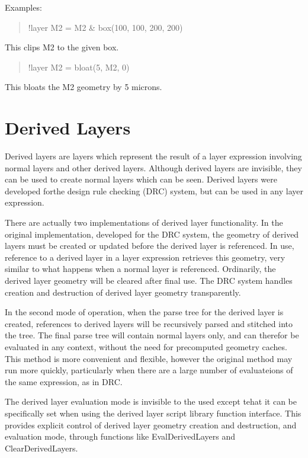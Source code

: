     Examples:

\begin{quote}
    {\vt !layer M2 = M2 \& box(100, 100, 200, 200)}
\end{quote}
      This clips M2 to the given box.

\begin{quote}
    {\vt !layer M2 = bloat(5, M2, 0)}
\end{quote}
      This bloats the M2 geometry by 5 microns.

\section{Derived Layers}
\label{drvlyr}
Derived layers are layers which represent the result of a layer
expression involving normal layers and other derived layers.  Although
derived layers are invisible, they can be used to create normal layers
which can be seen.  Derived layers were developed forthe design rule
checking (DRC) system, but can be used in any layer expression.

There are actually two implementations of derived layer functionality. 
In the original implementation, developed for the DRC system, the
geometry of derived layers must be created or updated before the
derived layer is referenced.  In use, reference to a derived layer in
a layer expression retrieves this geometry, very similar to what
happens when a normal layer is referenced.  Ordinarily, the derived
layer geometry will be cleared after final use.  The DRC system
handles creation and destruction of derived layer geometry
transparently.

In the second mode of operation, when the parse tree for the derived
layer is created, references to derived layers will be recursively
parsed and stitched into the tree.  The final parse tree will contain
normal layers only, and can therefor be evaluated in any context,
without the need for precomputed geometry caches.  This method is more
convenient and flexible, however the original method may run more
quickly, particularly when there are a large number of evaluateions of
the same expression, as in DRC.

The derived layer evaluation mode is invisible to the used except
tehat it can be specifically set when using the derived layer script
library function interface.  This provides explicit control of derived
layer geometry creation and destruction, and evaluation mode, through
functions like {\vt EvalDerivedLayers} and {\vt ClearDerivedLayers}.

